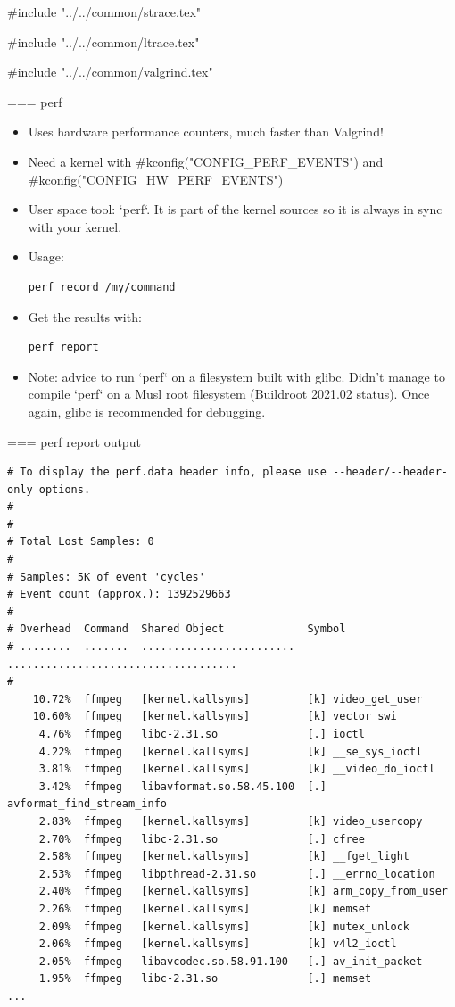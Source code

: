 #include "../../common/strace.tex"

#include "../../common/ltrace.tex"

#include "../../common/valgrind.tex"


=== perf
\begin{itemize}
	\item Uses hardware performance counters, much faster than Valgrind!
	\item Need a kernel with #kconfig("CONFIG_PERF_EVENTS") and #kconfig("CONFIG_HW_PERF_EVENTS")
	\item User space tool: `perf`. It is part of the kernel
		sources so it is always in sync with your kernel.
	\item Usage:
	\begin{block}{}
\begin{verbatim}
perf record /my/command
\end{verbatim}
	\end{block}
	\item Get the results with:
	\begin{block}{}
\begin{verbatim}
perf report
\end{verbatim}
	\end{block}
        \item Note: advice to run `perf` on a filesystem built with
              glibc. Didn't manage to compile `perf` on a Musl
              root filesystem (Buildroot 2021.02 status). Once again, glibc is
              recommended for debugging.
\end{itemize}


=== perf report output
\begin{block}{}
\tiny
\begin{verbatim}
# To display the perf.data header info, please use --header/--header-only options.
#
#
# Total Lost Samples: 0
#
# Samples: 5K of event 'cycles'
# Event count (approx.): 1392529663
#
# Overhead  Command  Shared Object             Symbol
# ........  .......  ........................  ....................................
#
    10.72%  ffmpeg   [kernel.kallsyms]         [k] video_get_user
    10.60%  ffmpeg   [kernel.kallsyms]         [k] vector_swi
     4.76%  ffmpeg   libc-2.31.so              [.] ioctl
     4.22%  ffmpeg   [kernel.kallsyms]         [k] __se_sys_ioctl
     3.81%  ffmpeg   [kernel.kallsyms]         [k] __video_do_ioctl
     3.42%  ffmpeg   libavformat.so.58.45.100  [.] avformat_find_stream_info
     2.83%  ffmpeg   [kernel.kallsyms]         [k] video_usercopy
     2.70%  ffmpeg   libc-2.31.so              [.] cfree
     2.58%  ffmpeg   [kernel.kallsyms]         [k] __fget_light
     2.53%  ffmpeg   libpthread-2.31.so        [.] __errno_location
     2.40%  ffmpeg   [kernel.kallsyms]         [k] arm_copy_from_user
     2.26%  ffmpeg   [kernel.kallsyms]         [k] memset
     2.09%  ffmpeg   [kernel.kallsyms]         [k] mutex_unlock
     2.06%  ffmpeg   [kernel.kallsyms]         [k] v4l2_ioctl
     2.05%  ffmpeg   libavcodec.so.58.91.100   [.] av_init_packet
     1.95%  ffmpeg   libc-2.31.so              [.] memset
...
\end{verbatim}
\end{block}


